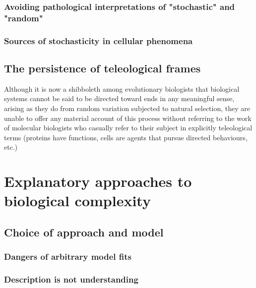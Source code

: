 \subsubsection{Avoiding pathological interpretations of "stochastic" and "random"}

\subsubsection{Sources of stochasticity in cellular phenomena}


\subsection{The persistence of teleological frames}

Although it is now a shibboleth among evolutionary biologists that biological systems cannot be said to be directed toward ends in any meaningful sense, arising as they do from random variation subjected to natural selection, they are unable to offer any material account of this process without referring to the work of molecular biologists who casually refer to their subject in explicitly teleological terms (proteins have functions, cells are agents that pursue directed behaviours, etc.)
 

\section{Explanatory approaches to biological complexity}
\subsection{Choice of approach and model}
\subsubsection{Dangers of arbitrary model fits}
\subsubsection{Description is not understanding}

